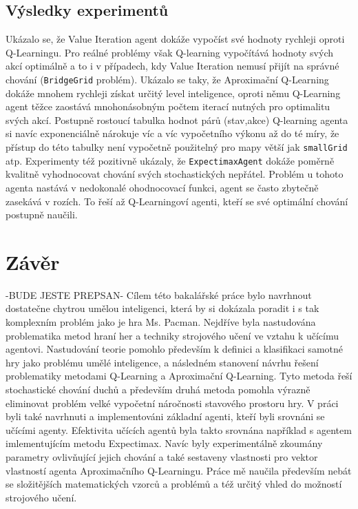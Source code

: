\section{Výsledky experimentů}
Ukázalo se, že Value Iteration agent dokáže vypočíst své hodnoty rychleji oproti Q-Learningu. Pro reálné problémy však 
Q-learning vypočítává hodnoty svých akcí optimálně a to i v případech, kdy Value Iteration nemusí přijít na správné chování (\texttt{BridgeGrid} problém). Ukázalo se taky, že Aproximační Q-Learning dokáže mnohem rychleji získat určitý level inteligence, oproti němu Q-Learning agent těžce zaostává mnohonásobným počtem iterací nutných pro optimalitu svých akcí. Postupně rostoucí tabulka hodnot párů (stav,akce) Q-learning agenta si navíc exponenciálně nárokuje víc a víc vypočetního výkonu až do té míry, že přístup do této tabulky není vypočetně použitelný pro mapy větší jak \texttt{smallGrid} atp. Experimenty též pozitivně ukázaly, že \texttt{ExpectimaxAgent} dokáže poměrně  kvalitně vyhodnocovat chování svých stochastických nepřátel. Problém u tohoto agenta nastává v nedokonalé ohodnocovací funkci, agent se často zbytečně zasekává v rozích. To řeší až Q-Learningoví agenti, kteří se své optimální chování postupně naučili. 

\chapter{Závěr}
-BUDE JESTE PREPSAN-
Cílem této bakalářské práce bylo navrhnout dostatečne chytrou umělou inteligenci, která by si dokázala poradit i s tak komplexním problém jako je hra Ms. Pacman. Nejdříve byla nastudována problematika metod hraní her a techniky strojového učení ve vztahu k učícímu agentovi. Nastudování teorie pomohlo především k definici a klasifikaci samotné hry jako problému umělé inteligence, a následném stanovení návrhu řešení problematiky metodami Q-Learning a Aproximační Q-Learning. Tyto metoda řeší stochastické chování duchů a především druhá metoda pomohla výrazně eliminovat problém velké vypočetní náročnosti stavového prostoru hry. V práci byli také navrhnuti a implementováni základní agenti, kteří byli srovnáni se učícími agenty. Efektivita učících agentů byla takto srovnána například s agentem imlementujícím metodu Expectimax. Navíc byly experimentálně zkoumány parametry ovlivňující jejich chování a také sestaveny vlastnosti pro vektor vlastností agenta Aproximačního Q-Learningu. Práce mě naučila především nebát se složitějších matematických vzorců a problémů a též určitý vhled do možností strojového učení.

